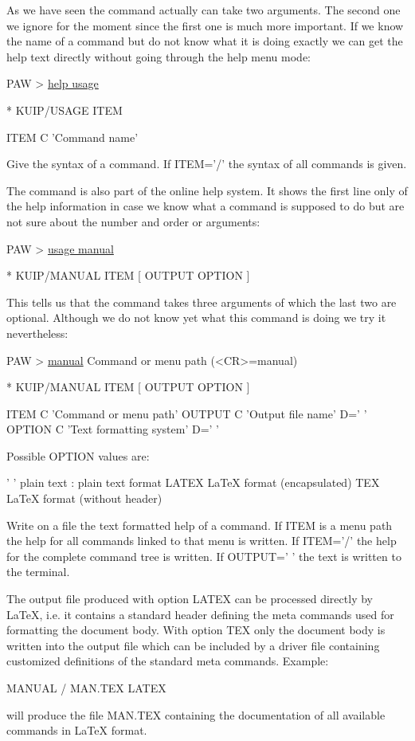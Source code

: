 As we have seen the  command actually can take two arguments.
The second one we ignore for the moment since the first one is much more
important.
If we know the name of a command but do not know what it is doing
exactly we can get the help text directly without going through the help
menu mode:
\begin{XMP}
PAW > \underline{help usage}

 * KUIP/USAGE ITEM

   ITEM       C 'Command name'

   Give the syntax of a command.  If ITEM='/' the syntax of all commands is
   given.
\end{XMP}

The command  is also part of the online help system.
It shows the first line only of the help information in case we know what a
command is supposed to do but are not sure about the number and order or
arguments:
\begin{XMP}
PAW > \underline{usage manual}

 * KUIP/MANUAL ITEM [ OUTPUT OPTION ]
\end{XMP}
This tells us that the  command takes three arguments of
which the last two are optional.
Although we do not know yet what this command is doing we try it
nevertheless:
\begin{XMP}
PAW > \underline{manual}
Command or menu path (<CR>=manual)

 * KUIP/MANUAL ITEM [ OUTPUT OPTION ]

   ITEM       C 'Command or menu path'
   OUTPUT     C 'Output file name' D=' '
   OPTION     C 'Text formatting system' D=' '

   Possible OPTION values are:

   ' '     plain text : plain text format
    LATEX  LaTeX format (encapsulated)
    TEX    LaTeX format (without header)

   Write on a file the text formatted help of a command.  If ITEM is a menu 
   path the help for all commands linked to that menu is written.  If ITEM='/' 
   the help for the complete command tree is written.  If OUTPUT=' ' the text 
   is written to the terminal.  

   The output file produced with option LATEX can be processed directly by 
   LaTeX, i.e. it contains a standard header defining the meta commands used 
   for formatting the document body.  With option TEX only the document body 
   is written into the output file which can be included by a driver file 
   containing customized definitions of the standard meta commands.  Example:  

    MANUAL / MAN.TEX LATEX

   will produce the file MAN.TEX containing the documentation of all available 
   commands in LaTeX format.  
\end{XMP}

